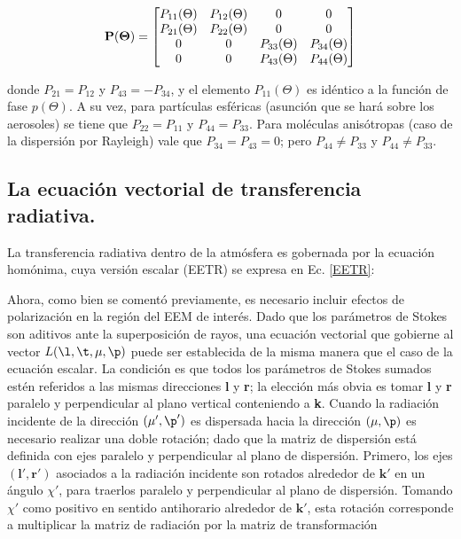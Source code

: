 \begin{equation}
\bf{P}(\Theta)=
\begin{bmatrix}
{P_{11}(\Theta)}&{P_{12}(\Theta)}&{0}&{0} \\
{P_{21}(\Theta)}&{P_{22}(\Theta)}&{0}&{0} \\
{0}&{0}&{P_{33}(\Theta)}&{P_{34}(\Theta)}\\
{0}&{0}&{P_{43}(\Theta)}&{P_{44}(\Theta)}\\
\end{bmatrix}
\label{lenoble10}
\end{equation}

donde $P_{21}=P_{12}$ y $P_{43}=-P_{34}$, y el elemento $P_{11}(\Theta)$ es idéntico a la función de fase $p(\Theta)$.
A su vez, para partículas esféricas (asunción que se hará sobre los aerosoles) se tiene que
$P_{22}=P_{11}$ y $P_{44}=P_{33}$. Para moléculas anisótropas (caso de la dispersión por
Rayleigh) vale que $P_{34}=P_{43}=0$; pero $P_{44}\neq P_{33}$ y $P_{44}\neq P_{33}$.


\subsection{La ecuación vectorial de transferencia radiativa.}

La transferencia radiativa dentro de la atmósfera es gobernada por la 
ecuación homónima, cuya versión escalar (EETR) se expresa en Ec. \eqref{EETR}: 

Ahora, como bien se comentó previamente, es necesario incluir efectos de polarización
en la región del EEM de interés. Dado que los parámetros de Stokes son aditivos
ante la superposición de rayos, una ecuación vectorial que gobierne al vector $L(\l,\t,\mu,\p)$
puede ser establecida de la misma manera que el caso de la ecuación escalar.
La condición es que todos los parámetros de Stokes sumados estén referidos a las mismas direcciones
\textbf{l} y \textbf{r}; la elección más obvia es tomar \textbf{l} y \textbf{r} paralelo y perpendicular al plano vertical conteniendo a \textbf{k}. Cuando la radiación incidente de la dirección $(\mu',\p')$ es dispersada hacia la dirección $(\mu,\p)$ es necesario realizar una doble rotación; dado que la matriz de dispersión está definida con ejes paralelo y perpendicular al plano de dispersión. Primero, los ejes $(\textbf{l}',\textbf{r}')$  asociados a la radiación incidente son rotados alrededor de $\textbf{k}'$ en un ángulo $\chi'$, para traerlos paralelo y perpendicular al plano de dispersión. Tomando $\chi'$ como positivo en sentido antihorario alrededor de $\textbf{k}'$, esta rotación corresponde a multiplicar la matriz de radiación por la matriz de transformación

